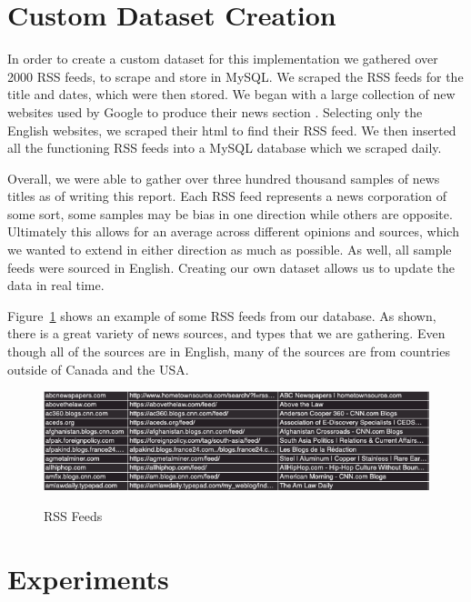 \documentclass[12pt]{article}
\begin{document}
\section{Custom Dataset Creation}
\hspace{\parindent}In order to create a custom dataset for this implementation we gathered over 2000 RSS feeds, to scrape and store in MySQL\@. We scraped the RSS feeds for the title and dates, which were then stored. We began with a large collection of new websites used by Google to produce their news section \cite{GoogleNewsBlog}. Selecting only the English websites, we scraped their html to find their RSS feed. We then inserted all the functioning RSS feeds into a MySQL database which we scraped daily.

Overall, we were able to gather over three hundred thousand samples of news titles as of writing this report. Each RSS feed represents a news corporation of some sort, some samples may be bias in one direction while others are opposite. Ultimately this allows for an average across different opinions and sources, which we wanted to extend in either direction as much as possible. As well, all sample feeds were sourced in English. Creating our own dataset allows us to update the data in real time.

 Figure~\ref{RSS} shows an example of some RSS feeds from our database. As shown, there is a great variety of news sources, and types that we are gathering. Even though all of the sources are in English, many of the sources are from countries outside of Canada and the USA. 

\vspace*{20px}

\begin{figure}[htp]
    \centering
    \includegraphics[scale=0.7]{feeds.PNG} \\
    \caption{RSS Feeds}
    \label{RSS}
\end{figure}





\clearpage
\section{Experiments}
\end{document}
